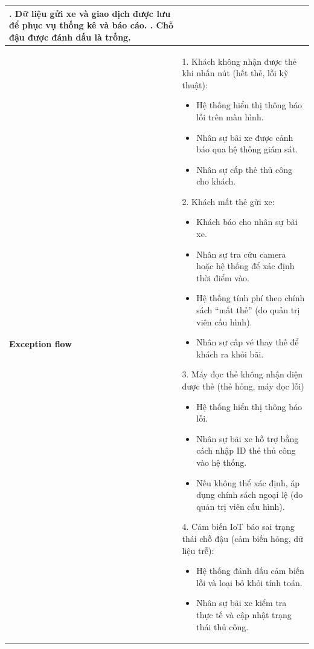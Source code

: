 \begin{longtable}{|>{\centering\arraybackslash}m{3cm}|m{13.7cm}|}
2. Dữ liệu gửi xe và giao dịch được lưu để phục vụ thống kê và báo cáo. \newline
3. Chỗ đậu được đánh dấu là trống. \\ \hline
\textbf{Exception flow} & 
1. Khách không nhận được thẻ khi nhấn nút (hết thẻ, lỗi kỹ thuật): 
\begin{itemize}
    \item Hệ thống hiển thị thông báo lỗi trên màn hình.
    \item Nhân sự bãi xe được cảnh báo qua hệ thống giám sát.
    \item Nhân sự cấp thẻ thủ công cho khách.
\end{itemize}
2. Khách mất thẻ gửi xe: 
\begin{itemize}
    \item Khách báo cho nhân sự bãi xe.
    \item Nhân sự tra cứu camera hoặc hệ thống để xác định thời điểm vào.
    \item Hệ thống tính phí theo chính sách “mất thẻ” (do quản trị viên cấu hình).
    \item Nhân sự cấp vé thay thế để khách ra khỏi bãi.
\end{itemize}
3. Máy đọc thẻ không nhận diện được thẻ (thẻ hỏng, máy đọc lỗi)
\begin{itemize}
    \item Hệ thống hiển thị thông báo lỗi.
    \item Nhân sự bãi xe hỗ trợ bằng cách nhập ID thẻ thủ công vào hệ thống.
    \item Nếu không thể xác định, áp dụng chính sách ngoại lệ (do quản trị viên cấu hình).
\end{itemize}
4. Cảm biến IoT báo sai trạng thái chỗ đậu (cảm biến hỏng, dữ liệu trễ):
\begin{itemize}
    \item Hệ thống đánh dấu cảm biến lỗi và loại bỏ khỏi tính toán.
    \item Nhân sự bãi xe kiểm tra thực tế và cập nhật trạng thái thủ công.
\end{itemize}
\\ \hline
\end{longtable}
\endgroup

